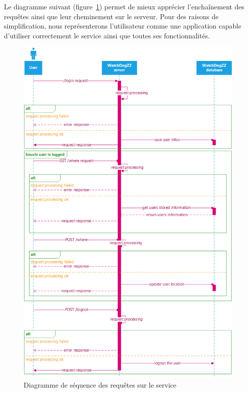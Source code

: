 Le diagramme suivant (figure~\ref{servicereq}) permet de mieux apprécier l'enchaînement des requêtes ainsi que leur cheminement sur le serveur. Pour des raisons de simplification, nous représenterons l'utilisateur comme une application capable d'utiliser correctement le service ainsi que toutes ses fonctionnalités.

\begin{figure}[H]
    \centering
    \includegraphics[width=\textwidth]{./img/server-requests.png}
    \caption{Diagramme de séquence des requêtes sur le service}
    \label{servicereq}
\end{figure}

